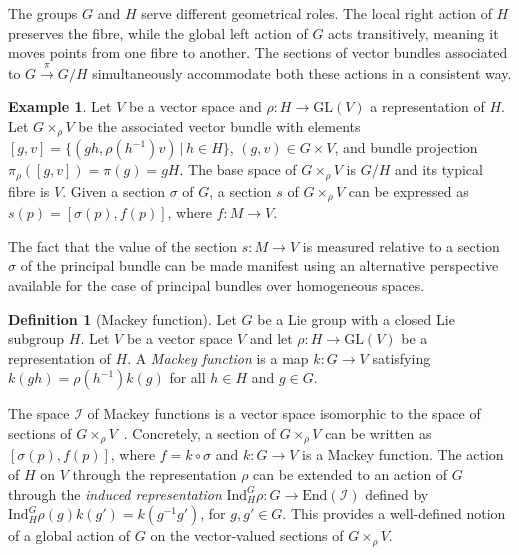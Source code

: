 \documentclass[12pt,a4paper]{article}
\numberwithin{equation}{section}
\theoremstyle{plain}
\theoremstyle{definition}
\newtheorem{definition}[theorem]{Definition}
\newtheorem{example}[theorem]{Example}
\theoremstyle{remark}
\begin{document}
The groups $G$ and $H$ serve different geometrical roles. The local right action of $H$ preserves the fibre, while the global left action of $G$ acts transitively, meaning it moves points from one fibre to another. The sections of vector bundles associated to $G\overset{\pi}{\to}G/H$ simultaneously accommodate both these actions in a consistent way.

\begin{example}\label{dfn:associated_bundle_homogeneous}
    Let $V$ be a vector space and $\rho:H \to \mathrm{GL}(V)$ a representation of $H$. Let $G \times_{\rho} V$ be the associated vector bundle with elements $[g,v]=\{(gh,\rho(h^{-1})v)\,|\,h\in H\}$, $(g,v)\in G \times V$, and bundle projection $\pi_{\rho}([g,v])=\pi(g)=gH$. The base space of $G \times_{\rho} V$ is $G/H$ and its typical fibre is $V$. Given a section $\sigma$ of $G$, a section $s$ of $G \times_{\rho} V$ can be expressed as $s(p) = [\sigma(p),f(p)]$, where $f: M \to V$.
\end{example}

The fact that the value of the section $s: M \to V$ is measured relative to a section $\sigma$ of the principal bundle can be made manifest using an alternative perspective available for the case of principal bundles over homogeneous spaces.

\begin{definition}[Mackey function]\label{dfn:mackey_fnc}
    Let $G$ be a Lie group with a closed Lie subgroup $H$. Let $V$ be a vector space $V$ and let $\rho:H\to \mathrm{GL}(V)$ be a representation of $H$. A \textit{Mackey function} is a map $k:G\to V$ satisfying $k(gh)=\rho(h^{-1})k(g)$ for all $h\in H$ and $g\in G$.
\end{definition}

The space $\mathcal{I}$ of Mackey functions is a vector space isomorphic to the space of sections of $G\times_{\rho}V$~\cite{Kolar2013}. Concretely, a section of $G \times_{\rho} V$ can be written as $[\sigma(p),f(p)]$, where $f = k \circ \sigma$ and $k:G \to V$ is a Mackey function. The action of $H$ on $V$ through the representation $\rho$ can be extended to an action of $G$ through the \textit{induced representation} $\mathrm{Ind}^G_H \rho : G \to \mathrm{End}(\mathcal{I})$ defined by $\mathrm{Ind}^G_H \rho (g) k(g') = k(g^{-1} g')$, for $g,g'\in G$. This provides a well-defined notion of a global action of $G$ on the vector-valued sections of $G \times_{\rho} V$.
\end{document}
